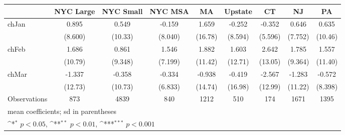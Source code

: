 {
\def\sym#1{\ifmmode^{#1}\else\(^{#1}\)\fi}
\begin{tabular}{l*{8}{c}}
\hline\hline
                    &\multicolumn{1}{c}{NYC Large}&\multicolumn{1}{c}{NYC Small}&\multicolumn{1}{c}{NYC MSA}&\multicolumn{1}{c}{MA}&\multicolumn{1}{c}{Upstate}&\multicolumn{1}{c}{CT}&\multicolumn{1}{c}{NJ}&\multicolumn{1}{c}{PA}\\
\hline
chJan               &       0.895         &       0.549         &      -0.159         &       1.659         &      -0.252         &      -0.352         &       0.646         &       0.635         \\
                    &     (8.600)         &     (10.33)         &     (8.040)         &     (16.78)         &     (8.594)         &     (5.596)         &     (7.752)         &     (10.46)         \\
[1em]
chFeb               &       1.686         &       0.861         &       1.546         &       1.882         &       1.603         &       2.642         &       1.785         &       1.557         \\
                    &     (10.79)         &     (9.348)         &     (7.199)         &     (11.42)         &     (12.71)         &     (13.05)         &     (9.364)         &     (11.40)         \\
[1em]
chMar               &      -1.337         &      -0.358         &      -0.334         &      -0.938         &      -0.419         &      -2.567         &      -1.283         &      -0.572         \\
                    &     (12.73)         &     (10.73)         &     (6.833)         &     (14.74)         &     (16.98)         &     (12.99)         &     (11.22)         &     (8.398)         \\
\hline
Observations        &         873         &        4839         &         840         &        1212         &         510         &         174         &        1671         &        1395         \\
\hline\hline
\multicolumn{9}{l}{\footnotesize mean coefficients; sd in parentheses}\\
\multicolumn{9}{l}{\footnotesize \sym{*} \(p<0.05\), \sym{**} \(p<0.01\), \sym{***} \(p<0.001\)}\\
\end{tabular}
}

